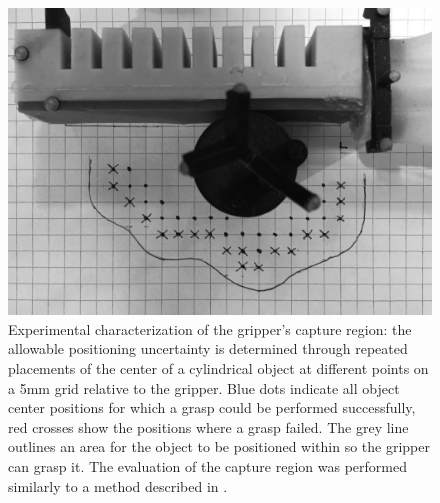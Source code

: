 
\begin{figure}[htb]
\centering
   \includegraphics[width=0.8\columnwidth]{Figures/experimental_results/uncertainty_bw}
   \caption{Experimental characterization of the gripper's capture region: the allowable positioning uncertainty is determined through repeated placements of the center of a cylindrical object at different points on a 5\unit{mm} grid relative to the gripper. Blue dots indicate all object center positions for which a grasp could be performed successfully, red crosses show the positions where a grasp failed. The grey line outlines an area for the object to be positioned within so the gripper can grasp it. The evaluation of the capture region was performed similarly to a method described in \cite{dogar2010push}.}
   \label{fig:grasp_uncertainty}
\end{figure} 

